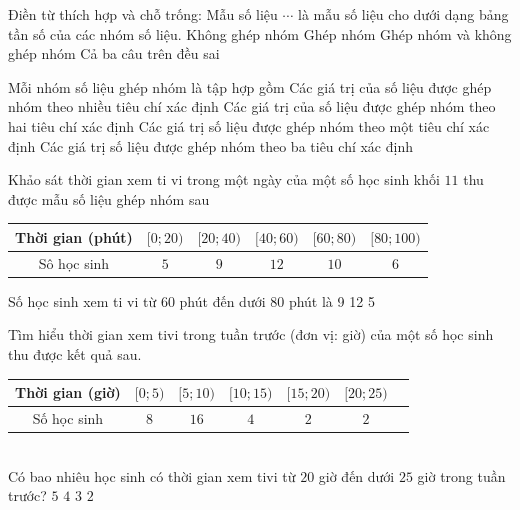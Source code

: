 \begin{ex}%
	Điền từ thích hợp và chỗ trống: Mẫu số liệu $\cdots$ là mẫu số liệu  cho dưới dạng bảng tần số của các nhóm số liệu.
	 \choice
		{Không ghép nhóm} 
		{\True Ghép nhóm} 
		{Ghép nhóm và không  ghép nhóm}
		{Cả ba câu trên đều  sai}
\end{ex}

\begin{ex}%
	Mỗi nhóm  số liệu ghép nhóm là tập hợp gồm
	 \choice
		{Các giá trị của số liệu được  ghép nhóm theo nhiều tiêu chí xác định}
		 {Các giá trị của số liệu được ghép nhóm theo hai tiêu chí xác định}
		{\True Các giá trị số liệu được ghép  nhóm theo một tiêu chí xác định}
		{Các giá trị số liệu được ghép nhóm theo ba tiêu  chí xác định}
\end{ex}

\begin{ex}%
	Khảo sát thời gian xem ti vi trong một ngày của một số học  sinh khối $11$ thu được mẫu số liệu ghép nhóm sau
	\begin{center}
		\begin{tabular}{|c|c|c|c|c|c|}
			 \hline
			 Thời gian (phút) & $[0;20)$ & $[20;40)$ & $[40;60)$ & $[60;80)$ & $[80;100)$ \\
			 \hline
			Sô học sinh & $5$ & $9$ & $12$ &  $10$ & $6$ \\
			 \hline
		\end{tabular}
	\end{center}
	 Số học sinh xem ti vi từ $60$ phút đến dưới $80$ phút là
	 \choice
		 {9}
		{} 
		 {12}
		 {5}
\end{ex}

\begin{ex}%
	Tìm hiểu thời gian xem tivi trong tuần trước (đơn vị: giờ)  của một số học sinh thu được kết quả sau.
	\begin{table}[h]
		 \centering
		\begin{tabular}{|c|c|c|c|c|c|c|}
			\hline 
			Thời gian  (giờ) & $[0;5)$ & $[5;10)$ & $[10;15)$ & $[15;20)$ & $[20;25)$ \\
			 \hline
			Số học sinh & $8$ & $16$  & $4$ & $2$ & $2$ \\ \hline
		\end{tabular}
	\end{table}\\
	Có bao nhiêu học sinh có thời gian xem tivi từ $20$ giờ đến dưới $25$  giờ trong tuần trước?
	 \choice
		 {$5$}
		 {$4$}
		{$3$} 
		{\True $2$} 
\end{ex}

